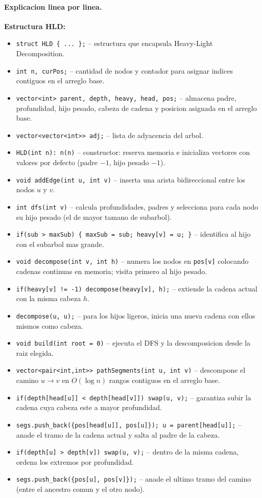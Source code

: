 \paragraph{Explicacion linea por linea.}
\textbf{Estructura HLD:}
\begin{itemize}\setlength\itemsep{0pt}
	\item \verb|struct HLD { ... };| -- estructura que encapsula Heavy-Light Decomposition.
	\item \verb|int n, curPos;| -- cantidad de nodos y contador para asignar indices contiguos en el arreglo base.
	\item \verb|vector<int> parent, depth, heavy, head, pos;| -- almacena padre, profundidad, hijo pesado, cabeza de cadena y posicion asignada en el arreglo base.
	\item \verb|vector<vector<int>> adj;| -- lista de adyacencia del arbol.
	\item \verb|HLD(int n): n(n)| -- constructor: reserva memoria e inicializa vectores con valores por defecto (padre $-1$, hijo pesado $-1$).
	\item \verb|void addEdge(int u, int v)| -- inserta una arista bidireccional entre los nodos $u$ y $v$.
	\item \verb|int dfs(int v)| -- calcula profundidades, padres y selecciona para cada nodo su hijo pesado (el de mayor tamano de subarbol).
	\item \verb|if(sub > maxSub) { maxSub = sub; heavy[v] = u; }| -- identifica al hijo con el subarbol mas grande.
	\item \verb|void decompose(int v, int h)| -- numera los nodos en \verb|pos[v]| colocando cadenas continuas en memoria; visita primero al hijo pesado.
	\item \verb|if(heavy[v] != -1) decompose(heavy[v], h);| -- extiende la cadena actual con la misma cabeza $h$.
	\item \verb|decompose(u, u);| -- para los hijos ligeros, inicia una nueva cadena con ellos mismos como cabeza.
	\item \verb|void build(int root = 0)| -- ejecuta el DFS y la descomposicion desde la raiz elegida.
	\item \verb|vector<pair<int,int>> pathSegments(int u, int v)| -- descompone el camino $u \to v$ en $O(\log n)$ rangos contiguos en el arreglo base.
	\item \verb|if(depth[head[u]] < depth[head[v]]) swap(u, v);| -- garantiza subir la cadena cuya cabeza este a mayor profundidad.
	\item \verb|segs.push_back({pos[head[u]], pos[u]}); u = parent[head[u]];| -- anade el tramo de la cadena actual y salta al padre de la cabeza.
	\item \verb|if(depth[u] > depth[v]) swap(u, v);| -- dentro de la misma cadena, ordena los extremos por profundidad.
	\item \verb|segs.push_back({pos[u], pos[v]});| -- anade el ultimo tramo del camino (entre el ancestro comun y el otro nodo).
\end{itemize}
